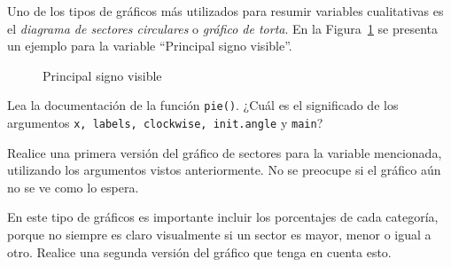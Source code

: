 \documentclass{prob}
\begin{document}
	\begin{problema}
	Uno de los tipos de gráficos más utilizados para resumir variables cualitativas es el \textit{diagrama de sectores circulares} o \textit{gráfico de torta}. En la Figura~\ref{fig:plot01} se presenta un ejemplo para la variable \textquotedblleft Principal signo visible\textquotedblright.\\

\begin{figure}[!ht]
    \centering
    
    \caption{Principal signo visible}
    \label{fig:plot01}
\end{figure}

	\begin{parte}
		Lea la documentación de la función \texttt{pie()}. ¿Cuál es el significado de los argumentos \texttt{x, labels, clockwise, init.angle} y \texttt{main}?
	\end{parte}

	\begin{parte}
		Realice una primera versión del gráfico de sectores para la variable mencionada, utilizando los argumentos vistos anteriormente. No se preocupe si el gráfico aún no se ve como lo espera.
	\end{parte}	
	
	\begin{parte}	
	En este tipo de gráficos es importante incluir los porcentajes de cada categoría, porque no siempre es claro visualmente si un sector es mayor, menor o igual a otro. Realice una segunda versión del gráfico que tenga en cuenta esto.\\		
		
		\noindent{}	
	\end{parte}	
	

\end{problema}
\end{document}

